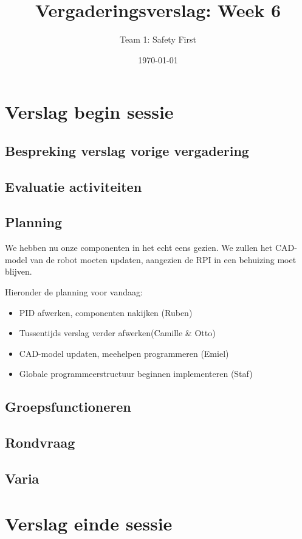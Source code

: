 \documentclass[a4paper,kulak]{kulakarticle} %
\date{\today}
\title{Vergaderingsverslag: Week 6}
\author{Team 1: Safety First}
\begin{document}
\maketitle

\section{Verslag begin sessie}
\subsection{Bespreking verslag vorige vergadering}
\subsection{Evaluatie activiteiten}
\subsection{Planning}
We hebben nu onze componenten in het echt eens gezien. We zullen het CAD-model van de robot moeten updaten, aangezien de RPI in een behuizing moet blijven.

Hieronder de planning voor vandaag:
\begin{itemize}
	\item PID afwerken, componenten nakijken (Ruben)
	\item Tussentijds verslag verder afwerken(Camille \& Otto)
	\item CAD-model updaten, meehelpen programmeren (Emiel)
	\item Globale programmeerstructuur beginnen implementeren (Staf)
\end{itemize}

\subsection{Groepsfunctioneren}
\subsection{Rondvraag}
\subsection{Varia}




\section{Verslag einde sessie}
\end{document}
